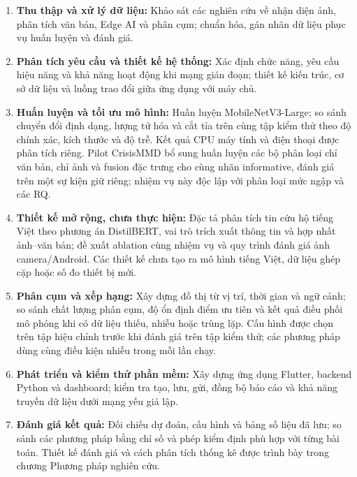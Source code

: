 \begin{enumerate}
    \item \textbf{Thu thập và xử lý dữ liệu:} Khảo sát các nghiên cứu về nhận diện ảnh, phân tích văn bản, Edge AI và phân cụm; chuẩn hóa, gán nhãn dữ liệu phục vụ huấn luyện và đánh giá.
    \item \textbf{Phân tích yêu cầu và thiết kế hệ thống:} Xác định chức năng, yêu cầu hiệu năng và khả năng hoạt động khi mạng gián đoạn; thiết kế kiến trúc, cơ sở dữ liệu và luồng trao đổi giữa ứng dụng với máy chủ.
    \item \textbf{Huấn luyện và tối ưu mô hình:} Huấn luyện MobileNetV3-Large; so sánh chuyển đổi định dạng, lượng tử hóa và cắt tỉa trên cùng tập kiểm thử theo độ chính xác, kích thước và độ trễ. Kết quả CPU máy tính và điện thoại được phân tích riêng. Pilot CrisisMMD bổ sung huấn luyện các bộ phân loại chỉ văn bản, chỉ ảnh và fusion đặc trưng cho cùng nhãn informative, đánh giá trên một sự kiện giữ riêng; nhiệm vụ này độc lập với phân loại mức ngập và các RQ.
    \item \textbf{Thiết kế mở rộng, chưa thực hiện:} Đặc tả phân tích tin cứu hộ tiếng Việt theo phương án DistilBERT, vai trò trích xuất thông tin và hợp nhất ảnh--văn bản; đề xuất ablation cùng nhiệm vụ và quy trình đánh giá ảnh camera/Android. Các thiết kế chưa tạo ra mô hình tiếng Việt, dữ liệu ghép cặp hoặc số đo thiết bị mới.
    \item \textbf{Phân cụm và xếp hạng:} Xây dựng đồ thị từ vị trí, thời gian và ngữ cảnh; so sánh chất lượng phân cụm, độ ổn định điểm ưu tiên và kết quả điều phối mô phỏng khi có dữ liệu thiếu, nhiễu hoặc trùng lặp. Cấu hình được chọn trên tập hiệu chỉnh trước khi đánh giá trên tập kiểm thử; các phương pháp dùng cùng điều kiện nhiễu trong mỗi lần chạy.
    \item \textbf{Phát triển và kiểm thử phần mềm:} Xây dựng ứng dụng Flutter, backend Python và dashboard; kiểm tra tạo, lưu, gửi, đồng bộ báo cáo và khả năng truyền dữ liệu dưới mạng yếu giả lập.
    \item \textbf{Đánh giá kết quả:} Đối chiếu dự đoán, cấu hình và bảng số liệu đã lưu; so sánh các phương pháp bằng chỉ số và phép kiểm định phù hợp với từng bài toán. Thiết kế đánh giá và cách phân tích thống kê được trình bày trong chương Phương pháp nghiên cứu.
\end{enumerate}



